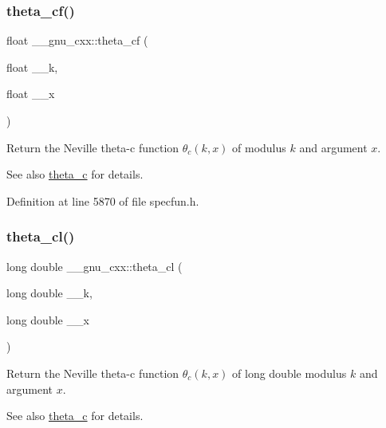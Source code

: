 \subsubsection{\texorpdfstring{theta\+\_\+cf()}{theta\_cf()}}
{\footnotesize\ttfamily float \+\_\+\+\_\+gnu\+\_\+cxx\+::theta\+\_\+cf (\begin{DoxyParamCaption}\item[{float}]{\+\_\+\+\_\+k,  }\item[{float}]{\+\_\+\+\_\+x }\end{DoxyParamCaption})\hspace{0.3cm}{\ttfamily [inline]}}

Return the Neville theta-\/c function $ \theta_c(k,x) $ of modulus $ k $ and argument $ x $.

\begin{DoxySeeAlso}{See also}
\hyperlink{group__gnu__math__spec__func_ga3ebbb6513c39e1d55b08cba7d169ce3d}{theta\+\_\+c} for details. 
\end{DoxySeeAlso}


Definition at line 5870 of file specfun.\+h.

\mbox{\label{group__gnu__math__spec__func_ga0531098c628999cf396217ff997cfdda}} 
\subsubsection{\texorpdfstring{theta\+\_\+cl()}{theta\_cl()}}
{\footnotesize\ttfamily long double \+\_\+\+\_\+gnu\+\_\+cxx\+::theta\+\_\+cl (\begin{DoxyParamCaption}\item[{long double}]{\+\_\+\+\_\+k,  }\item[{long double}]{\+\_\+\+\_\+x }\end{DoxyParamCaption})\hspace{0.3cm}{\ttfamily [inline]}}

Return the Neville theta-\/c function $ \theta_c(k,x) $ of {\ttfamily long double} modulus $ k $ and argument $ x $.

\begin{DoxySeeAlso}{See also}
\hyperlink{group__gnu__math__spec__func_ga3ebbb6513c39e1d55b08cba7d169ce3d}{theta\+\_\+c} for details. 
\end{DoxySeeAlso}


